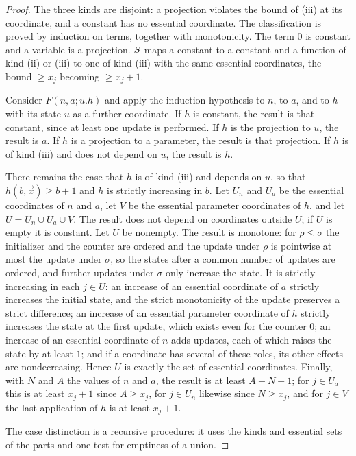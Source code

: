 \begin{proof}
The three kinds are disjoint: a projection violates the bound of (iii) at its
coordinate, and a constant has no essential coordinate. The classification is
proved by induction on terms, together with monotonicity. The term $0$ is
constant and a variable is a projection. $S$ maps a constant to a constant
and a function of kind (ii) or (iii) to one of kind (iii) with the same
essential coordinates, the bound $\ge x_j$ becoming $\ge x_j+1$.

Consider $F(n,a;u.h)$ and apply the induction hypothesis to $n$, to $a$, and
to $h$ with its state $u$ as a further coordinate. If $h$ is constant, the
result is that constant, since at least one update is performed. If $h$ is
the projection to $u$, the result is $a$. If $h$ is a projection to a
parameter, the result is that projection. If $h$ is of kind (iii) and does
not depend on $u$, the result is $h$.

There remains the case that $h$ is of kind (iii) and depends on $u$, so that
$h(b,\vec x)\ge b+1$ and $h$ is strictly increasing in $b$. Let $U_n$ and
$U_a$ be the essential coordinates of $n$ and $a$, let $V$ be the essential
parameter coordinates of $h$, and let $U=U_n\cup U_a\cup V$. The result does
not depend on coordinates outside $U$; if $U$ is empty it is constant. Let $U$
be nonempty. The result is monotone: for $\rho\le\sigma$ the initializer and
the counter are ordered and the update under $\rho$ is pointwise at most the
update under $\sigma$, so the states after a common number of updates are
ordered, and further updates under $\sigma$ only increase the state. It is
strictly increasing in each $j\in U$: an increase of an essential coordinate
of $a$ strictly increases the initial state, and the strict monotonicity of
the update preserves a strict difference; an increase of an essential
parameter coordinate of $h$ strictly increases the state at the first update,
which exists even for the counter $0$; an increase of an essential coordinate
of $n$ adds updates, each of which raises the state by at least $1$; and if a
coordinate has several of these roles, its other effects are nondecreasing.
Hence $U$ is exactly the set of essential coordinates. Finally, with $N$ and
$A$ the values of $n$ and $a$, the result is at least $A+N+1$; for $j\in U_a$
this is at least $x_j+1$ since $A\ge x_j$, for $j\in U_n$ likewise since
$N\ge x_j$, and for $j\in V$ the last application of $h$ is at least $x_j+1$.

The case distinction is a recursive procedure: it uses the kinds and
essential sets of the parts and one test for emptiness of a union.
\end{proof}

